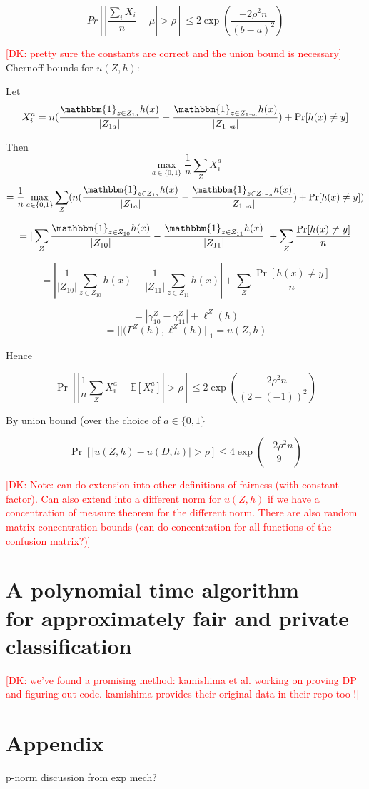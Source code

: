 \documentclass[format = sigconf]{acmart}
\newcommand{\dk}[1]{\textcolor{red}{[DK: #1]}}
\newcommand{\1}{\mathbbm{1}}
\newcommand{\z}[1]{Z_{#1}}
\theoremstyle{definition}
\begin{document}
$$Pr[|\frac{\sum_i X_i}{n} - \mu| > \rho] \leq 2\exp(\frac{-2\rho^2n}{(b-a)^2})$$

\dk {pretty sure the constants are correct and the union bound is necessary}
Chernoff bounds for $u(Z,h)$:

Let $$X_i^a = n(\frac{\1_{z\in Z_{1a}}h(x)}{|Z_{1a}|} - \frac{\1_{z\in
Z_{1\neg a}}h(x)}{|Z_{1 \neg a}|} ) + \Pr[h(x) \neq y]$$

Then $$\max_{a\in \{0,1\}}\frac{1}{n} \sum_Z X_i^a$$
$$ =\frac{1}{n}
\max_{a\in \{0,1\}} \sum_Z (n(\frac{\1_{z\in Z_{1a}}h(x)}{|Z_{1a}|} -
\frac{\1_{z\in Z_{1\neg a}}h(x)}{|Z_{1 \neg a}|} ) + \Pr[h(x) \neq y])$$

$$= |\sum_Z \frac{\1_{z\in \z{10}}h(x)}{|\z{10}|} - \frac{\1_{z\in
Z_{11}}h(x)}{|Z_{11}|}| +  \sum_Z \frac{\Pr[h(x) \neq y] }{n}$$

$$= |\frac{1}{|\z{10}|} \sum_{z\in \z{10}} h(x) - \frac{1}{|Z_{11}|} \sum_{z\in Z_{11}} h(x)| +  \sum_Z \frac{\Pr[h(x) \neq y] }{n}$$

$$=|\gamma_{10}^Z - \gamma_{11}^Z| + \ell^Z(h) $$
$$=||(\Gamma^Z(h), \ell^Z(h)||_{1} = u(Z,h)$$

Hence

$$\Pr[|\frac{1}{n} \sum_Z X_i^a - \mathbb{E}[X_i^a]| > \rho] \leq 2\exp(\frac{-2\rho^2n}{(2-(-1))^2})$$

By union bound (over the choice of $a \in \{0,1\}$

$$\Pr[|u(Z,h) - u(D,h)| > \rho] \leq 4\exp(\frac{-2\rho^2n}{9})$$

\dk {Note: can do extension into other definitions of fairness (with constant factor).
	Can also extend into a different norm for $u(Z,h)$ if we have a
  concentration of measure theorem for the different norm. There are
  also random matrix concentration bounds (can do concentration for all
  functions of the confusion matrix?)}

\section{A polynomial time algorithm \\for approximately fair and private classification}
\dk {we've found a promising method: kamishima et al. working on proving DP and figuring out code. kamishima provides their original data in their repo too !}

\section{Appendix}
p-norm discussion from exp mech?
\end{document}
